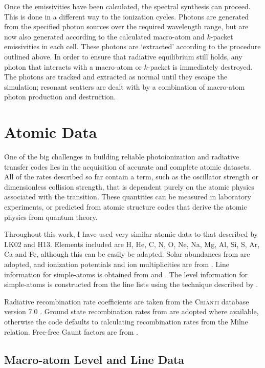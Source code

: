 Once the emissivities have been calculated, the spectral synthesis can proceed.
This is done in a different way to the ionization cycles. Photons 
are generated from the specified photon sources over the required wavelength range,
but are now also generated according to the calculated macro-atom and 
$k$-packet emissivities in each cell. These photons are `extracted' according
to the procedure outlined above.
In order to ensure that radiative equilibrium 
still holds, any photon that interacts with a macro-atom or $k$-packet is immediately 
destroyed. The photons are tracked and extracted as normal until they escape the 
simulation; resonant scatters are dealt with by a combination of
macro-atom photon production and destruction.

\section{Atomic Data}
\label{sec:atomic_data}
One of the big challenges in building reliable photoionization and radiative
transfer codes lies in the acquisition of accurate and complete atomic datasets.
All of the rates described so far contain a term, such as the oscillator strength 
or dimensionless collision strength, that is dependent purely on the atomic physics
associated with the transition. These quantities can be measured in laboratory experiments,
or predicted from atomic structure codes that derive the atomic physics from 
quantum theory.

Throughout this work, I have used very similar atomic data to that described 
by LK02 and H13. Elements included are H, He, C, N, O, Ne, Na, Mg, Al, Si, S,
Ar, Ca and Fe, although this can be easily be adapted. Solar abundances from
\cite{vernerbarthel1994} are adopted, and ionization potentials and ion
multiplicities are from \cite{verner1996}. Line information for simple-atoms 
is obtained from \citet[][$\sim5,000$ lines]{verner1996} 
and \citet[][$\sim55,000$ lines]{kurucz1995}. 
The level information for simple-atoms is constructed 
from the line lists using the technique described by \cite{lucy1999sne}.

Radiative recombination rate coefficients are taken from 
the \textsc{Chianti} database version 7.0 \citep{dere1997,landi2012}.
Ground state recombination rates from \cite{badnell2006} are adopted where available,
otherwise the code defaults to calculating recombination rates from the Milne
relation. Free-free Gaunt factors are from \cite{sutherland1998}.

\subsection{Macro-atom Level and Line Data}

